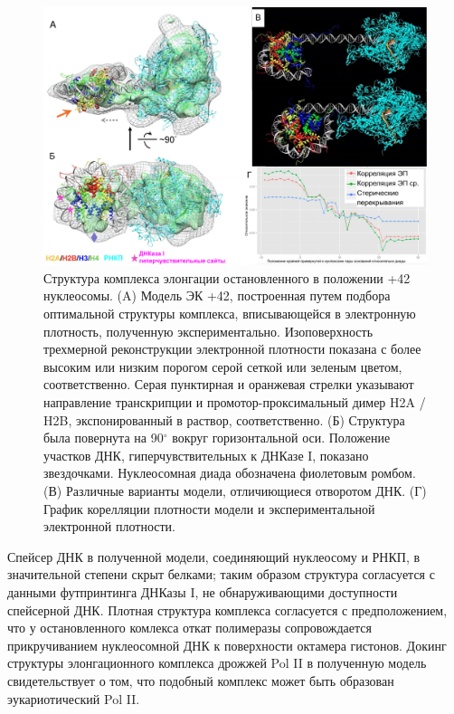    \begin{figure} [H]
    \centering
    \includegraphics[width=\textwidth]{images/p6/p6_2/p6_2_pnas_f6.pdf}
    \caption[Структура комплекса элонгации остановленного в положении +42 нуклеосомы.]{Структура комплекса элонгации остановленного в положении +42 нуклеосомы. (A) Модель ЭК +42, построенная путем подбора оптимальной структуры комплекса, вписывающейся в электронную плотность, полученную экспериментально. Изоповерхность трехмерной реконструкции электронной плотности показана с более высоким или низким порогом серой сеткой или зеленым цветом, соответственно. Серая пунктирная и оранжевая стрелки указывают направление транскрипции и промотор-проксимальный димер H2A / H2B, экспонированный в раствор, соответственно. (Б) Структура была повернута на 90$^\circ$ вокруг горизонтальной оси. Положение участков ДНК, гиперчувствительных к ДНКазе I, показано звездочками. Нуклеосомная диада обозначена фиолетовым ромбом. (В) Различные варианты модели, отличиющиеся отворотом ДНК. (Г) График корелляции плотности модели и экспериментальной электронной плотности.}
    \label{fig:p6_2_pnas_f6}
\end{figure}
   
   
   Спейсер ДНК в полученной модели, соединяющий нуклеосому и РНКП, в значительной степени скрыт белками; таким образом структура согласуется с данными футпринтинга ДНКазы I, не обнаруживающими доступности спейсерной ДНК. Плотная структура комплекса согласуется с предположением, что у остановленного комлекса откат полимеразы сопровождается прикручиванием нуклеосомной ДНК к поверхности октамера гистонов. Докинг структуры элонгационного комплекса дрожжей Pol II в полученную модель свидетельствует о том, что подобный комплекс может быть образован эукариотический Pol II.
    
